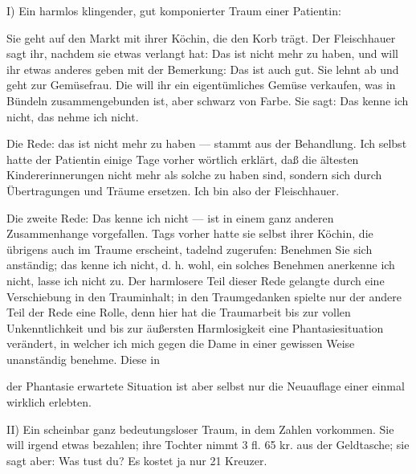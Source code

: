 \documentclass[twoside=true,titlepage=false,open=any, parskip=never, fontsize=10pt, headings=small, chapterprefix=false, appendixprefix=false]{scrbook}
\begin{document}
            
        \pstart
        I) Ein harmlos klingender, gut komponierter Traum einer
               Patientin:
        \pend
    
            
        \pstart
        Sie geht auf den Markt mit ihrer Köchin, die den Korb trägt. Der
                  Fleischhauer sagt ihr, nachdem sie etwas verlangt hat: Das ist nicht mehr zu
                  haben, und will ihr etwas anderes geben mit der Bemerkung: Das ist auch gut. Sie
                  lehnt ab und geht zur Gemüsefrau. Die will ihr ein eigentümliches Gemüse
                  verkaufen, was in Bündeln zusammengebunden ist, aber schwarz von Farbe. Sie sagt:
                  Das kenne ich nicht, das nehme ich nicht.
        \pend
    
            
        \pstart
        Die Rede: das ist nicht mehr zu haben — stammt aus der Behandlung. Ich selbst
               hatte der Patientin einige Tage vorher wörtlich erklärt, daß die ältesten
               Kindererinnerungen nicht mehr als solche zu haben sind, sondern sich durch Übertragungen und Träume ersetzen. Ich bin also der Fleischhauer.
        \pend
    
            
        \pstart
        Die zweite Rede: Das kenne ich nicht — ist in
               einem ganz anderen Zusammenhange vorgefallen. Tags vorher hatte sie selbst
               ihrer Köchin, die übrigens auch im Traume erscheint, tadelnd zugerufen: Benehmen Sie sich anständig; das kenne ich nicht, d.
               h. wohl, ein solches Benehmen anerkenne ich nicht, lasse ich nicht zu. Der
               harmlosere Teil dieser Rede gelangte durch eine Verschiebung in den Trauminhalt;
               in den Traumgedanken spielte nur der andere Teil der Rede eine Rolle, denn
               hier hat die Traumarbeit bis zur vollen Unkenntlichkeit und bis zur äußersten
               Harmlosigkeit eine Phantasiesituation verändert, in welcher ich mich
               gegen die Dame in einer gewissen Weise unanständig
                  benehme. Diese in
        \pend
    
         
            
            
            
        \pstart
        der Phantasie erwartete Situation ist aber selbst nur die Neuauflage einer einmal wirklich erlebten.
        \pend
    
            
        \pstart
        II) Ein scheinbar ganz bedeutungsloser Traum, in dem
               Zahlen vorkommen. Sie will irgend etwas bezahlen; ihre
                  Tochter nimmt 3 fl. 65 kr. aus der Geldtasche; sie sagt aber: Was tust du? Es
                  kostet ja nur 21 Kreuzer.
        \pend
    
\end{document}
